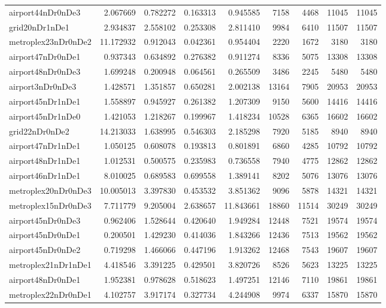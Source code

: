 \begin{longtable}{|l|r|r|r|r|r|r|r|r|}
airport44nDr0nDe3 & 2.067669 & 0.782272 & 0.163313 & 0.945585 & 7158 & 4468 & 11045 & 11045 \\
grid20nDr1nDe1 & 2.934837 & 2.558102 & 0.253308 & 2.811410 & 9984 & 6410 & 11507 & 11507 \\
metroplex23nDr0nDe2 & 11.172932 & 0.912043 & 0.042361 & 0.954404 & 2220 & 1672 & 3180 & 3180 \\
airport47nDr0nDe1 & 0.937343 & 0.634892 & 0.276382 & 0.911274 & 8336 & 5075 & 13308 & 13308 \\
airport48nDr0nDe3 & 1.699248 & 0.200948 & 0.064561 & 0.265509 & 3486 & 2245 & 5480 & 5480 \\
airport3nDr0nDe3 & 1.428571 & 1.351857 & 0.650281 & 2.002138 & 13164 & 7905 & 20953 & 20953 \\
airport45nDr1nDe1 & 1.558897 & 0.945927 & 0.261382 & 1.207309 & 9150 & 5600 & 14416 & 14416 \\
airport45nDr1nDe0 & 1.421053 & 1.218267 & 0.199967 & 1.418234 & 10528 & 6365 & 16602 & 16602 \\
grid22nDr0nDe2 & 14.213033 & 1.638995 & 0.546303 & 2.185298 & 7920 & 5185 & 8940 & 8940 \\
airport47nDr1nDe1 & 1.050125 & 0.608078 & 0.193813 & 0.801891 & 6860 & 4285 & 10792 & 10792 \\
airport48nDr1nDe1 & 1.012531 & 0.500575 & 0.235983 & 0.736558 & 7940 & 4775 & 12862 & 12862 \\
airport46nDr1nDe1 & 8.010025 & 0.689583 & 0.699558 & 1.389141 & 8202 & 5076 & 13076 & 13076 \\
metroplex20nDr0nDe3 & 10.005013 & 3.397830 & 0.453532 & 3.851362 & 9096 & 5878 & 14321 & 14321 \\
metroplex15nDr0nDe3 & 7.711779 & 9.205004 & 2.638657 & 11.843661 & 18860 & 11514 & 30249 & 30249 \\
airport45nDr0nDe3 & 0.962406 & 1.528644 & 0.420640 & 1.949284 & 12448 & 7521 & 19574 & 19574 \\
airport45nDr0nDe1 & 0.200501 & 1.429230 & 0.414036 & 1.843266 & 12436 & 7513 & 19562 & 19562 \\
airport45nDr0nDe2 & 0.719298 & 1.466066 & 0.447196 & 1.913262 & 12468 & 7543 & 19607 & 19607 \\
metroplex21nDr1nDe1 & 4.418546 & 3.391225 & 0.429501 & 3.820726 & 8526 & 5623 & 13225 & 13225 \\
airport48nDr0nDe1 & 1.952381 & 0.978628 & 0.518623 & 1.497251 & 12146 & 7110 & 19861 & 19861 \\
metroplex22nDr0nDe1 & 4.102757 & 3.917174 & 0.327734 & 4.244908 & 9974 & 6337 & 15870 & 15870 \\

\end{longtable}
